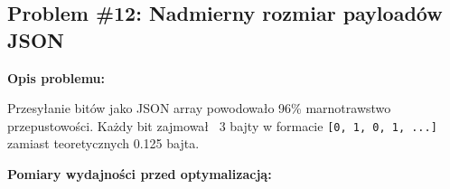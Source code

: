 \documentclass[12pt,a4paper]{article}
\begin{document}
  \subsection{Problem \#12: Nadmierny rozmiar payloadów JSON}                                                      
                                                                                                                   
  \begin{tcolorbox}[colback=violet!5!white,colframe=violet!75!black,title=Optymalizacja Backendu - Priorytet:      
  WYSOKI]                                                                                                          
  \textbf{Opis problemu:}                                                                                          
                                                                                                                   
  Przesyłanie bitów jako JSON array powodowało 96\% marnotrawstwo przepustowości. Każdy bit zajmował ~3 bajty w    
  formacie \texttt{[0, 1, 0, 1, ...]} zamiast teoretycznych 0.125 bajta.                                           
                                                                                                                   
  \textbf{Pomiary wydajności przed optymalizacją:}                                                                 
                                                                                                                   

\end{tcolorbox}
\end{document}
